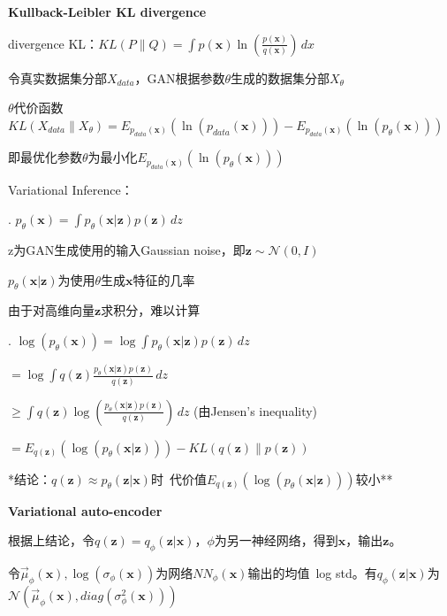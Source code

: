 \documentclass[UTF8]{ctexart}
\begin{document}
  \textbf{Kullback-Leibler KL divergence}

  \quad divergence KL：$KL(P \| Q) = \int p(\mathbf{x})\ln(\frac{p(\mathbf{x})}{q(\mathbf{x})}) \,dx $

  \quad 令真实数据集分部$X_{data}$，GAN根据参数$\theta$生成的数据集分部$X_{\theta}$
  
  \quad $\theta$代价函数$KL(X_{data} \| X_{\theta}) = E_{p_{data}(\mathbf{x})}(\ln(p_{data}(\mathbf{x}))) - E_{p_{data}(\mathbf{x})}(\ln(p_{\theta}(\mathbf{x})))$

  \quad \quad 即最优化参数$\theta$为最小化$E_{p_{data}(\mathbf{x})}(\ln(p_{\theta}(\mathbf{x})))$

  \quad Variational Inference：

  \quad {}. $p_{\theta}(\mathbf{x}) = \int p_{\theta}(\mathbf{x} | \mathbf{z})p(\mathbf{z}) \,dz $

  \quad \quad \quad z为GAN生成使用的输入Gaussian noise，即$\mathbf{z} \sim \mathcal{N}(0, I)$

  \quad \quad \quad $p_{\theta}(\mathbf{x} | \mathbf{z})$为使用$\theta$生成$\mathbf{x}$特征的几率

  \quad \quad \quad 由于对高维向量$\mathbf{z}$求积分，难以计算

  \quad {}. $\log(p_{\theta}(\mathbf{x})) = \log\int p_{\theta}(\mathbf{x} | \mathbf{z})p(\mathbf{z}) \,dz $

  \quad \quad \quad $ = \log\int q(\mathbf{z})\frac{p_{\theta}(\mathbf{x} | \mathbf{z})p(\mathbf{z})}{q(\mathbf{z})} \,dz $

  \quad \quad \quad $ \geq \int q(\mathbf{z})\log(\frac{p_{\theta}(\mathbf{x} | \mathbf{z})p(\mathbf{z})}{q(\mathbf{z})}) \,dz $ (由Jensen's inequality)

  \quad \quad \quad $ = E_{q(\mathbf{z})}(\log(p_{\theta}(\mathbf{x} | \mathbf{z}))) - KL(q(\mathbf{z})\|p(\mathbf{z})) $

  \quad \quad **结论：$q(\mathbf{z}) \approx p_{\theta}(\mathbf{z} | \mathbf{x})$时\ 代价值$E_{q(\mathbf{z})}(\log(p_{\theta}(\mathbf{x} | \mathbf{z})))$较小**

  \textbf{Variational auto-encoder}

  \quad 根据上结论，令$q(\mathbf{z}) = q_{\phi}(\mathbf{z} | \mathbf{x})$，$\phi$为另一神经网络，得到$\mathbf{x}$，输出$\mathbf{z}$。

  \quad 令$\vec{\mu}_{\phi}(\mathbf{x}), \log(\sigma_{\phi}(\mathbf{x}))$为网络$NN_{\phi}(\mathbf{x})$输出的均值\ log std。有$q_{\phi}(\mathbf{z} | \mathbf{x})$为$\mathcal{N}(\vec{\mu}_{\phi}(\mathbf{x}), diag(\sigma^2_{\phi}(\mathbf{x})))$
\end{document}
